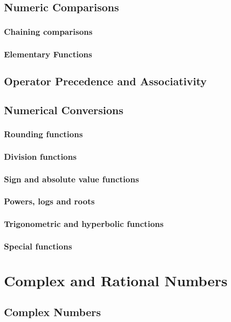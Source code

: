     \section{Numeric Comparisons}
    \subsection{Chaining comparisons}
    \subsection{Elementary Functions}
    \section{Operator Precedence and Associativity}
    \section{Numerical Conversions}
    \subsection{Rounding functions}
    \subsection{Division functions}
    \subsection{Sign and absolute value functions}
    \subsection{Powers, logs and roots}
    \subsection{Trigonometric and hyperbolic functions}
    \subsection{Special functions}
\chapter{Complex and Rational Numbers}
    \section{Complex Numbers}
